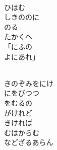 \documentclass[10pt,b5j]{tarticle} %
\begin{document}
\begin{enumerate}
\begin{minipage}[c]{\blocksize}
        \vspace{\linespace}
        \item~\\
        ひはむ\\
        しきののに\\
        のる\\
        たかくへ\\
        「にふの\\
        よにあれ」
        
        \vspace{\linespace}
        \item~\\
        きのぞみをにけ\\
        にをびつつ\\
        をむるの\\
        がけれど\\
        きければ\\
        むはからむ\\
        などざるあらん
    
    \end{minipage}
\end{enumerate} %
\end{document}
